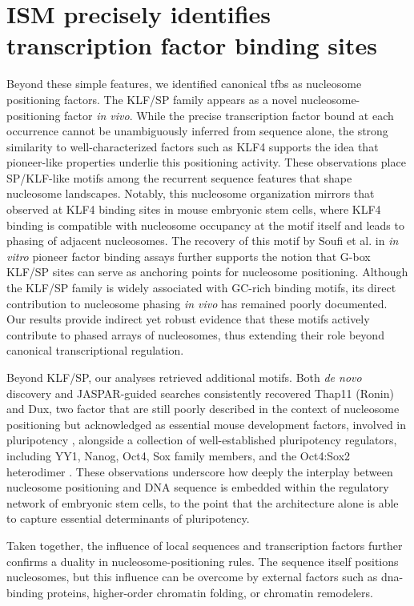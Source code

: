 \documentclass[11pt]{book}
\begin{document}
\section{ISM precisely identifies transcription factor binding sites}
Beyond these simple features, we identified canonical \gls{tfbs} as nucleosome positioning factors. The KLF/SP family appears as a novel nucleosome-positioning factor \textit{in vivo}. While the precise transcription factor bound at each occurrence cannot be unambiguously inferred from sequence alone, the strong similarity to well-characterized factors such as KLF4 supports the idea that pioneer-like properties underlie this positioning activity. These observations place SP/KLF-like motifs among the recurrent sequence features that shape nucleosome landscapes. Notably, this nucleosome organization mirrors that observed at KLF4 binding sites in mouse embryonic stem cells, where KLF4 binding is compatible with nucleosome occupancy at the motif itself and leads to phasing of adjacent nucleosomes. The recovery of this motif by Soufi et al. in \textit{in vitro} pioneer factor binding assays \cite{soufi_pioneer_2015} further supports the notion that G-box KLF/SP sites can serve as anchoring points for nucleosome positioning.
Although the KLF/SP family is widely associated with GC-rich binding motifs, its direct contribution to nucleosome phasing \textit{in vivo} has remained poorly documented. Our results provide indirect yet robust evidence that these motifs actively contribute to phased arrays of nucleosomes, thus extending their role beyond canonical transcriptional regulation.

Beyond KLF/SP, our analyses retrieved additional motifs. Both \textit{de novo} discovery and JASPAR-guided searches consistently recovered Thap11 (Ronin) and Dux, two factor that are still poorly described in the context of nucleosome positioning but acknowledged as essential mouse development factors, involved in pluripotency \cite{dejosez_ronin_2008, ren_dux_2022}, alongside a collection of well-established pluripotency regulators, including YY1, Nanog, Oct4, Sox family members, and the Oct4:Sox2 heterodimer \cite{tyagi_chromatin_2016, festuccia_transcription_2019}. These observations underscore how deeply the interplay between nucleosome positioning and DNA sequence is embedded within the regulatory network of embryonic stem cells, to the point that the architecture alone is able to capture essential determinants of pluripotency.

Taken together, the influence of local sequences and transcription factors further confirms a duality in nucleosome-positioning rules. The sequence itself positions nucleosomes, but this influence can be overcome by external factors such as \gls{dna}-binding proteins, higher-order chromatin folding, or chromatin remodelers.
\end{document}
